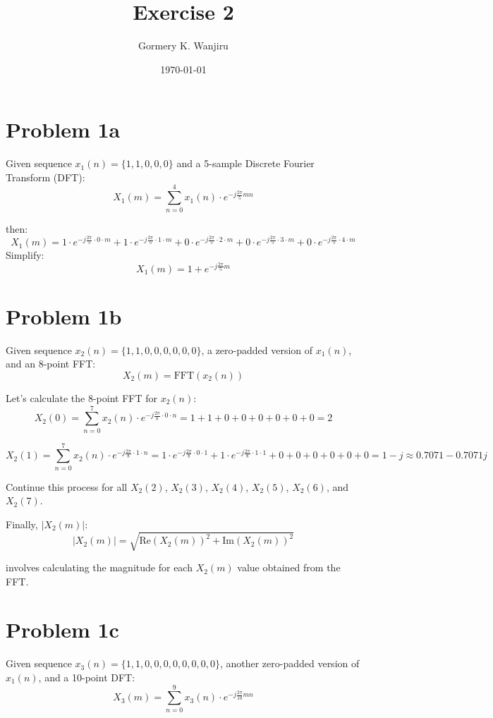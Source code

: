 \documentclass{article}
\title{Exercise 2}
\author{Gormery K. Wanjiru}
\date{\today}
\begin{document}
\maketitle

\section*{Problem 1a}
Given sequence \( x_1(n) = \{1, 1, 0, 0, 0\} \) and a 5-sample Discrete Fourier Transform (DFT):
\[ X_1(m) = \sum_{n=0}^{4} x_1(n) \cdot e^{-j\frac{2\pi}{5}mn} \]

then:
\[ X_1(m) = 1 \cdot e^{-j\frac{2\pi}{5} \cdot 0 \cdot m} + 1 \cdot e^{-j\frac{2\pi}{5} \cdot 1 \cdot m} + 0 \cdot e^{-j\frac{2\pi}{5} \cdot 2 \cdot m} + 0 \cdot e^{-j\frac{2\pi}{5} \cdot 3 \cdot m} + 0 \cdot e^{-j\frac{2\pi}{5} \cdot 4 \cdot m} \]
Simplify:
\[ X_1(m) = 1 + e^{-j\frac{2\pi}{5}m} \]

\section*{Problem 1b}
Given sequence \( x_2(n) = \{1, 1, 0, 0, 0, 0, 0, 0\} \), a zero-padded version of \( x_1(n) \), and an 8-point FFT:
\[ X_2(m) = \text{FFT}(x_2(n)) \]

Let's calculate the 8-point FFT for \( x_2(n) \):
\[ X_2(0) = \sum_{n=0}^{7} x_2(n) \cdot e^{-j\frac{2\pi}{8} \cdot 0 \cdot n} = 1 + 1 + 0 + 0 + 0 + 0 + 0 + 0 = 2 \]

\[ X_2(1) = \sum_{n=0}^{7} x_2(n) \cdot e^{-j\frac{2\pi}{8} \cdot 1 \cdot n} = 1 \cdot e^{-j\frac{2\pi}{8} \cdot 0 \cdot 1} + 1 \cdot e^{-j\frac{2\pi}{8} \cdot 1 \cdot 1} + 0 + 0 + 0 + 0 + 0 + 0 = 1 - j \approx 0.7071 - 0.7071j \]

Continue this process for all \( X_2(2) \), \( X_2(3) \), \( X_2(4) \), \( X_2(5) \), \( X_2(6) \), and \( X_2(7) \).

Finally, \( |X_2(m)| \):
\[ |X_2(m)| = \sqrt{\text{Re}(X_2(m))^2 + \text{Im}(X_2(m))^2} \]

involves calculating the magnitude for each \( X_2(m) \) value obtained from the FFT.

\section*{Problem 1c}
Given sequence \( x_3(n) = \{1, 1, 0, 0, 0, 0, 0, 0, 0, 0\} \), another zero-padded version of \( x_1(n) \), and a 10-point DFT:
\[ X_3(m) = \sum_{n=0}^{9} x_3(n) \cdot e^{-j\frac{2\pi}{10}mn} \]
\end{document}
